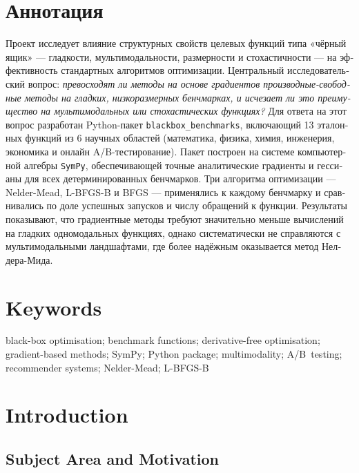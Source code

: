 \section*{Аннотация}
\begin{otherlanguage}{russian}
Проект исследует влияние структурных свойств целевых функций типа «чёрный
ящик» — гладкости, мультимодальности, размерности и стохастичности — на
эффективность стандартных алгоритмов оптимизации. Центральный исследовательский
вопрос: \emph{превосходят ли методы на основе градиентов производные-свободные
методы на гладких, низкоразмерных бенчмарках, и исчезает ли это преимущество
на мультимодальных или стохастических функциях?} Для ответа на этот вопрос
разработан Python-пакет \texttt{blackbox\_benchmarks}, включающий 13 эталонных
функций из 6 научных областей (математика, физика, химия, инженерия, экономика
и онлайн A/B-тестирование). Пакет построен на системе компьютерной алгебры
\texttt{SymPy}, обеспечивающей точные аналитические градиенты и гессианы для
всех детерминированных бенчмарков. Три алгоритма оптимизации — Nelder-Mead,
L-BFGS-B и BFGS — применялись к каждому бенчмарку и сравнивались по доле
успешных запусков и числу обращений к функции. Результаты показывают, что
градиентные методы требуют значительно меньше вычислений на гладких
одномодальных функциях, однако систематически не справляются с мультимодальными
ландшафтами, где более надёжным оказывается метод Нелдера-Мида.
\end{otherlanguage}

\section*{Keywords}
black-box optimisation; benchmark functions; derivative-free optimisation;
gradient-based methods; SymPy; Python package; multimodality; A/B~testing;
recommender systems; Nelder-Mead; L-BFGS-B

\clearpage

\section{Introduction}

\subsection{Subject Area and Motivation}

